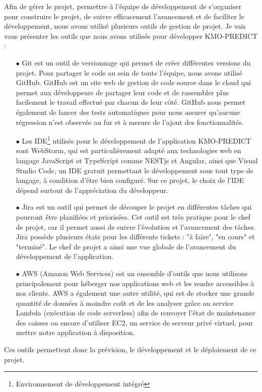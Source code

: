 \documentclass[12pt]{article}
\begin{document}
\justify
\text Afin de gérer le projet, permettre à l'équipe de développement de s'organiser pour construire le projet, de suivre efficacement l'avancement et de faciliter le développement, nous avons utilisé plusieurs outils de gestion de projet. Je vais vous présenter les outils que nous avons utilisés pour développer KMO-PREDICT : 
\begin{itemize}

    \item [$\bullet$] Git est un outil de versionnage qui permet de créer différentes versions du projet. Pour partager le code au sein de toute l'équipe, nous avons utilisé GitHub. GitHub est un site web de gestion de code source dans le cloud qui permet aux développeurs de partager leur code et de rassembler plus facilement le travail effectué par chacun de leur côté. GitHub nous permet également de lancer des tests automatiques pour nous assurer qu'aucune régression n'est observée au fur et à mesure de l'ajout des fonctionnalités.
    
    \item [$\bullet$]Les IDE\footnote{Environnement de développement intégré} utilisés pour le développement de l'application KMO-PREDICT sont WebStorm, qui est particulièrement adapté aux technologies web en langage JavaScript et TypeScript comme NESTjs et Angular, ainsi que Visual Studio Code, un IDE gratuit permettant le développement sous tout type de langage, à condition d'être bien configuré. Sur ce projet, le choix de l'IDE dépend surtout de l'appréciation du développeur.
    
    \item [$\bullet$] Jira est un outil qui permet de découper le projet en différentes tâches qui pourront être planifiées et priorisées. Cet outil est très pratique pour le chef de projet, car il permet aussi de suivre l'évolution et l'avancement des tâches. Jira possède plusieurs états pour les différents tickets : "à faire", "en cours" et "terminé". Le chef de projet a ainsi une vue globale de l'avancement du développement de l'application.
    \item [$\bullet$] AWS (Amazon Web Services) est un ensemble d'outils que nous utilisons principalement pour héberger nos applications web et les rendre accessibles à nos clients. AWS a également une autre utilité, qui est de stocker une grande quantité de données à moindre coût et de les analyser grâce au service Lambda (exécution de code serverless) afin de renvoyer l'état de maintenance des caisses ou encore d'utiliser EC2, un service de serveur privé virtuel, pour mettre notre application à disposition.
\end{itemize}
\justify
\text Ces outils permettent donc la prévision, le développement et le déploiement de ce projet.
\end{document}
